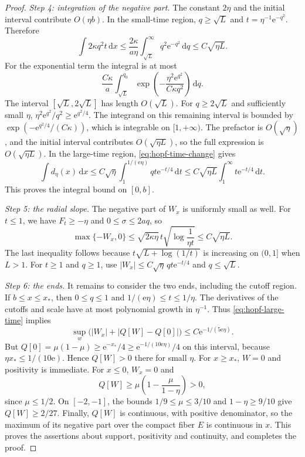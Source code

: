 \begin{proof}
\medskip\noindent\emph{Step 4: integration of the negative part.} The constant $2\eta$ and the initial interval contribute $O(\eta b)$. In the small-time region, $q\geq\sqrt L$ and $t=\eta^{-1}\mathrm{e}^{-q^2}$. Therefore
\[
 \int 2\kappa q^2t\,\mathrm{d}x
 \leq\frac{2\kappa}{a\eta}
       \int_{\sqrt L}^{\infty}q^2\mathrm{e}^{-q^2}\,\mathrm{d}q
 \leq C\sqrt{\eta L}.
\]
For the exponential term the integral is at most
\[
 \frac{C\kappa}{a}
 \int_{\sqrt L}^{q_0}
 \exp\left(-\frac{\eta^2\mathrm{e}^{q^2}}{C\kappa q^2}\right)\,\mathrm{d}q.
\]
The interval $[\sqrt L,2\sqrt L]$ has length $O(\sqrt L)$. For $q\geq2\sqrt L$ and sufficiently small $\eta$,
$\eta^2\mathrm{e}^{q^2}/q^2\geq \mathrm{e}^{q^2/4}$. The integrand on this remaining interval is bounded by $\exp(-\mathrm{e}^{q^2/4}/(C\kappa))$, which is integrable on $[1,+\infty)$. The prefactor is $O(\sqrt\eta)$, and the initial interval contributes $O(\sqrt{\eta L})$, so the full expression is $O(\sqrt{\eta L})$. In the large-time region, \eqref{eq:hopf-time-change} gives
\[
 \int d_\eta(x)\,\mathrm{d}x
 \leq C\sqrt\eta\int_1^{1/(\mathrm{e}\eta)}qt \mathrm{e}^{-t/4}\,\mathrm{d}t
 \leq C\sqrt{\eta L}\int_1^\infty t \mathrm{e}^{-t/4}\,\mathrm{d}t.
\]
This proves the integral bound on $[0,b]$.

\medskip\noindent\emph{Step 5: the radial slope.} The negative part of $W_x$ is uniformly small as well. For $t\leq1$, we have $F_t\geq-\eta$ and $0\leq\sigma\leq2aq$, so
\[
 \max\{-W_x,0\}\leq\sqrt{2\kappa\eta}\,
        t\sqrt{\log\frac1{\eta t}}\leq C\sqrt{\eta L}.
\]
The last inequality follows because $t\sqrt{L+\log(1/t)}$ is increasing on $(0,1]$ when $L>1$. For $t\geq1$ and $q\geq1$, use
$|W_x|\leq C\sqrt\eta\,qt \mathrm{e}^{-t/4}$ and $q\leq\sqrt L$.

\medskip\noindent\emph{Step 6: the ends.} It remains to consider the two ends, including the cutoff region. If $b\leq x\leq x_*$, then $0\leq q\leq1$ and
$1/(\mathrm{e}\eta)\leq t\leq1/\eta$. The derivatives of the cutoffs and scale have at most polynomial growth in $\eta^{-1}$. Thus \eqref{eq:hopf-large-time} implies
\[
 \sup_w\bigl(|W_x|+|Q[W]-Q[0]|\bigr)
 \leq C\mathrm{e}^{-1/(5\mathrm{e}\eta)}.
\]
But $Q[0]=\mu(1-\mu)\geq \mathrm{e}^{-x_*}/4\geq\mathrm{e}^{-1/(10\mathrm{e}\eta)}/4$ on this interval, because $\eta x_*\leq1/(10\mathrm{e})$. Hence $Q[W]>0$ there for small $\eta$. For $x\geq x_*$, $W=0$ and positivity is immediate. For $x\leq0$, $W_x=0$ and
\[
 Q[W]\geq\mu\left(1-\frac\mu{1-\eta}\right)>0,
\]
since $\mu\leq1/2$. On $[-2,-1]$, the bounds $1/9\leq\mu\leq3/10$ and $1-\eta\geq9/10$ give $Q[W]\geq2/27$. Finally, $Q[W]$ is continuous, with positive denominator, so the maximum of its negative part over the compact fiber $E$ is continuous in $x$. This proves the assertions about support, positivity and continuity, and completes the proof.
\end{proof}

